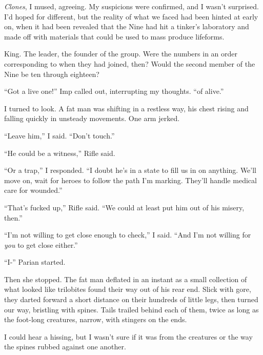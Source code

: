 \emph{Clones}, I mused, agreeing.  My suspicions were confirmed, and I wasn't surprised.  I'd hoped for different, but the reality of what we faced had been hinted at early on, when it had been revealed that the Nine had hit a tinker's laboratory and made off with materials that could be used to mass produce lifeforms.



King.  The leader, the founder of the group.  Were the numbers in an order corresponding to when they had joined, then?  Would the second member of the Nine be ten through eighteen?



``Got a live one!''  Imp called out, interrupting my thoughts.  ``\ldotsKind of alive.''



I turned to look.  A fat man was shifting in a restless way, his chest rising and falling quickly in unsteady movements.  One arm jerked.



``Leave him,'' I said.  ``Don't touch.''



``He could be a witness,'' Rifle said.



``Or a trap,'' I responded.  ``I doubt he's in a state to fill us in on anything.  We'll move on, wait for heroes to follow the path I'm marking.  They'll handle medical care for wounded.''



``That's fucked up,'' Rifle said.  ``We could at least put him out of his misery, then.''



``I'm not willing to get close enough to check,'' I said.  ``And I'm not willing for \emph{you} to get close either.''



``I-'' Parian started.



Then she stopped.  The fat man deflated in an instant as a small collection of what looked like trilobites found their way out of his rear end.  Slick with gore, they darted forward a short distance on their hundreds of little legs, then turned our way, bristling with spines.  Tails trailed behind each of them, twice as long as the foot-long creatures, narrow, with stingers on the ends.



I could hear a hissing, but I wasn't sure if it was from the creatures or the way the spines rubbed against one another.



